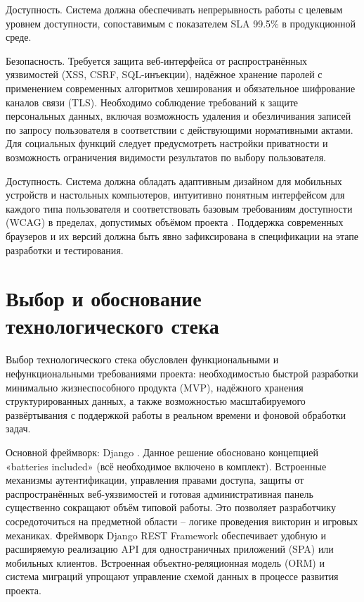 \documentclass[14pt,a4paper]{extreport}
\begin{document}
Доступность. Система должна обеспечивать непрерывность работы с целевым уровнем доступности, сопоставимым с показателем SLA 99.5\% в продукционной среде.

Безопасность. Требуется защита веб-интерфейса от распространённых уязвимостей (XSS, CSRF, SQL-инъекции), надёжное хранение паролей с применением современных алгоритмов хеширования и обязательное шифрование каналов связи (TLS). Необходимо соблюдение требований к защите персональных данных, включая возможность удаления и обезличивания записей по запросу пользователя в соответствии с действующими нормативными актами. Для социальных функций следует предусмотреть настройки приватности и возможность ограничения видимости результатов по выбору пользователя.

Доступность. Система должна обладать адаптивным дизайном для мобильных устройств и настольных компьютеров, интуитивно понятным интерфейсом для каждого типа пользователя и соответствовать базовым требованиям доступности (WCAG) в пределах, допустимых объёмом проекта \cite{wcag}. Поддержка современных браузеров и их версий должна быть явно зафиксирована в спецификации на этапе разработки и тестирования.

\section{Выбор и обоснование технологического стека}

Выбор технологического стека обусловлен функциональными и нефункциональными требованиями проекта: необходимостью быстрой разработки минимально жизнеспособного продукта (MVP), надёжного хранения структурированных данных, а также возможностью масштабируемого развёртывания с поддержкой работы в реальном времени и фоновой обработки задач.

Основной фреймворк: Django \cite{django,djangorest}. Данное решение обосновано концепцией «batteries included» (всё необходимое включено в комплект). Встроенные механизмы аутентификации, управления правами доступа, защиты от распространённых веб-уязвимостей и готовая административная панель существенно сокращают объём типовой работы. Это позволяет разработчику сосредоточиться на предметной области -- логике проведения викторин и игровых механиках. Фреймворк Django REST Framework обеспечивает удобную и расширяемую реализацию API для одностраничных приложений (SPA) или мобильных клиентов. Встроенная объектно-реляционная модель (ORM) и система миграций упрощают управление схемой данных в процессе развития проекта.
\end{document}
